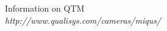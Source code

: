 \section *  {}

\begin{thebibliography}{5}

             Information on QTM \\ 
\textit{http://www.qualisys.com/cameras/miqus/}

\end{thebibliography}
